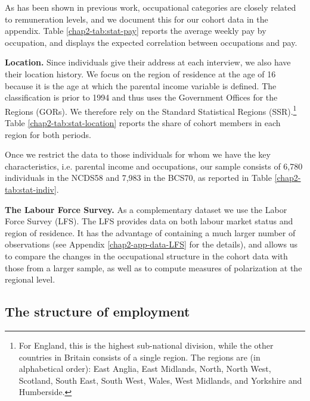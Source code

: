 As has been shown in previous work, occupational categories are closely related to remuneration levels, and we document this for our cohort data in the appendix. Table \ref{chap2-tab:stat-pay} reports the average weekly pay by occupation, and displays the expected correlation between occupations and pay. 

\textbf{Location.} Since individuals give their address at each interview, we also have their location history. We focus on the region of residence at the age of 16 because it is the age at which the parental income variable is defined. The classification is prior to 1994 and thus uses the Government Offices for the Regions (GORs). We therefore rely on the Standard Statistical Regions (SSR).\footnote{For England, this is the highest sub-national division, while the other countries in Britain consists of a single region. The regions are (in alphabetical order): East Anglia, East Midlands, North, North West, Scotland, South East, South West, Wales, West Midlands, and Yorkshire and Humberside.} Table \ref{chap2-tab:stat-location} reports the share of cohort members in each region for both periods.

Once we restrict the data to those individuals for whom we have the key characteristics, i.e. parental income and occupations, our sample consists of 6,780 individuals in the NCDS58 and 7,983 in the BCS70, as reported in Table \ref{chap2-tab:stat-indiv}.

\textbf{The Labour Force Survey.} As a complementary dataset we use the Labor Force Survey (LFS). The LFS provides data on both labour market status and region of residence. It has the advantage of containing a much larger number of observations (see Appendix \ref{chap2-app-data-LFS} for the details), and allows us to compare the changes in the occupational structure in the cohort data with those from a larger sample, as well as to compute measures of polarization at the regional level.


\subsection{The structure of employment}

